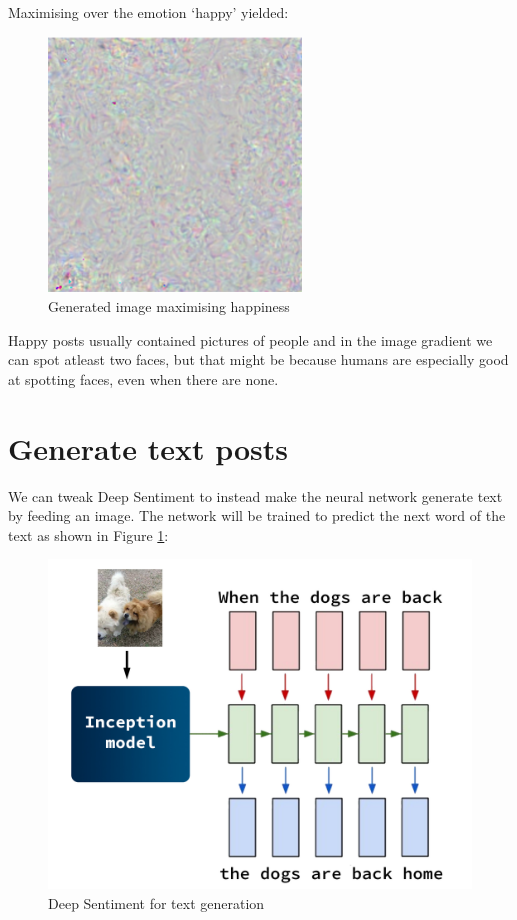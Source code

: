 Maximising over the emotion `happy' yielded:

\begin{figure}[H]
    \centering
    \includegraphics[width=0.6\textwidth]{Images/happy_gradient.png}
    \caption{Generated image maximising happiness}
\end{figure}

Happy posts usually contained pictures of people and in the image gradient we can spot atleast two faces, but that might be because humans are especially good at spotting faces, even when there are none.

\newpage
\section{Generate text posts}

We can tweak Deep Sentiment to instead make the neural network generate text by feeding an image. The network will be trained to predict the next word of the text as shown in Figure \ref{deep-prediction}:

\begin{figure}[H]
    \centering
    \includegraphics[width=\textwidth]{Images/deep-prediction.jpg}
    \caption{Deep Sentiment for text generation}
    \label{deep-prediction}
\end{figure}

